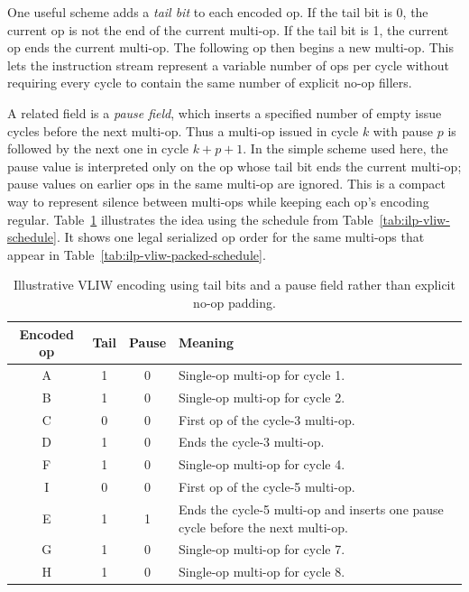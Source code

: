 One useful scheme adds a \textit{tail bit} to each encoded op.
If the tail bit is 0, the current op is not the end of the current multi-op.
If the tail bit is 1, the current op ends the current multi-op.
The following op then begins a new multi-op.
This lets the instruction stream represent a variable number of ops per cycle without requiring every cycle to contain the same number of explicit no-op fillers.

A related field is a \textit{pause field}, which inserts a specified number of empty issue cycles before the next multi-op.
Thus a multi-op issued in cycle $k$ with pause $p$ is followed by the next one in cycle $k+p+1$.
In the simple scheme used here, the pause value is interpreted only on the op whose tail bit ends the current multi-op; pause values on earlier ops in the same multi-op are ignored.
This is a compact way to represent silence between multi-ops while keeping each op's encoding regular.
Table~\ref{tab:ilp-vliw-encoding} illustrates the idea using the schedule from Table~\ref{tab:ilp-vliw-schedule}.
It shows one legal serialized op order for the same multi-ops that appear in Table~\ref{tab:ilp-vliw-packed-schedule}.
\begin{table}[t]
    \centering
    \renewcommand{\arraystretch}{1.15}
    \begin{tabular}{|c|c|c|p{2.9in}|}
        \hline
        Encoded op & Tail & Pause & Meaning                                                                         \\
        \hline
        A          & 1    & 0     & Single-op multi-op for cycle 1.                                                 \\
        \hline
        B          & 1    & 0     & Single-op multi-op for cycle 2.                                                 \\
        \hline
        C          & 0    & 0     & First op of the cycle-3 multi-op.                                               \\
        \hline
        D          & 1    & 0     & Ends the cycle-3 multi-op.                                                      \\
        \hline
        F          & 1    & 0     & Single-op multi-op for cycle 4.                                                 \\
        \hline
        I          & 0    & 0     & First op of the cycle-5 multi-op.                                               \\
        \hline
        E          & 1    & 1     & Ends the cycle-5 multi-op and inserts one pause cycle before the next multi-op. \\
        \hline
        G          & 1    & 0     & Single-op multi-op for cycle 7.                                                 \\
        \hline
        H          & 1    & 0     & Single-op multi-op for cycle 8.                                                 \\
        \hline
    \end{tabular}
    \caption{Illustrative VLIW encoding using tail bits and a pause field rather than explicit no-op padding.}
    \label{tab:ilp-vliw-encoding}
\end{table}
